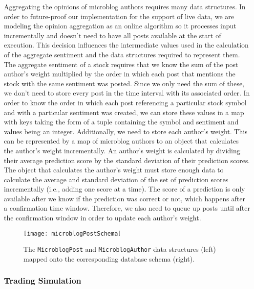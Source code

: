 Aggregating the opinions of microblog authors requires many data structures.
In order to future-proof our implementation for the support of live data, we are modeling the opinion aggregation as an online algorithm so it processes input incrementally and doesn't need to have all posts available at the start of execution.
This decision influences the intermediate values used in the calculation of the aggregate sentiment and the data structures required to represent them.
The aggregate sentiment of a stock requires that we know the sum of the post author's weight multiplied by the order in which each post that mentions the stock with the same sentiment was posted.
Since we only need the sum of these, we don't need to store every post in the time interval with its associated order.
In order to know the order in which each post referencing a particular stock symbol and with a particular sentiment was created, we can store these values in a map with keys taking the form of a tuple containing the symbol and sentiment and values being an integer.
Additionally, we need to store each author's weight.
This can be represented by a map of microblog authors to an object that calculates the author's weight incrementally.
An author's weight is calculated by dividing their average prediction score by the standard deviation of their prediction scores.
The object that calculates the author's weight must store enough data to calculate the average and standard deviation of the set of prediction scores incrementally (i.e., adding one score at a time).
The score of a prediction is only available after we know if the prediction was correct or not, which happens after a confirmation time window.
Therefore, we also need to queue up posts until after the confirmation window in order to update each author's weight.

\begin{figure}[h]
  \label{microblogPostSchema}
  \begin{center}
    \texttt{[image: microblogPostSchema]}
  \end{center}
  \caption{The \texttt{MicroblogPost} and \texttt{MicroblogAuthor} data structures (left) mapped onto the corresponding database schema (right).}
\end{figure}

\subsubsection{Trading Simulation}

